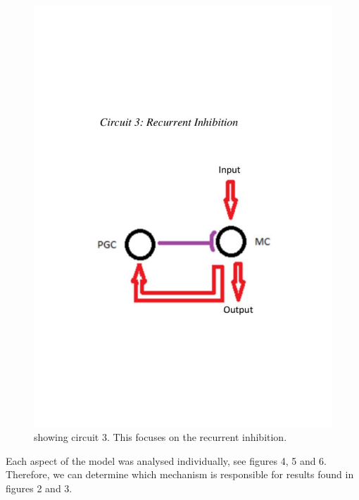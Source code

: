 \documentclass[11pt]{report}
\begin{document}
\begin{figure}[!ht]
\centering
\includegraphics[trim={0 6cm 0 6cm},clip, scale=0.5]{images/2017-11-06/Circuit_3.pdf}
\caption{showing circuit 3. This focuses on the recurrent inhibition.}
\end{figure} 

Each aspect of the model was analysed individually, see figures 4, 5 and 6. Therefore, we can determine which mechanism is responsible for results found in figures 2 and 3.
\newpage
\end{document}
